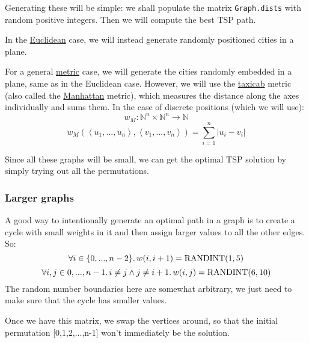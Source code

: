 \documentclass{article}
\newcommand{\randint}{\operatorname{RANDINT}}
\newcommand{\uu}[1]{\underline{#1}}
\newcommand{\py}[1]{\lstinline[language=Python]{#1}}
\begin{document}
Generating these will be simple: we shall populate the matrix
\py{Graph.dists} with random positive integers. Then we will
compute the best TSP path.

In the \uu{Euclidean} case, we will instead generate randomly positioned
cities in a plane.

For a general \uu{metric} case, we will generate the cities randomly embedded
in a plane, same as in the Euclidean case. However, we will use
the \uu{taxicab} metric (also called the \uu{Manhattan} metric), which measures
the distance along the axes individually and sums them. In the case of discrete
positions (which we will use):
\[ w_M: \mathbb{N}^n \times \mathbb{N}^n \to \mathbb{N} \]
\[ w_M\left(\left<u_1,...,u_n\right>, \left<v_1,...,v_n\right>\right) = \sum_{i=1}^n \left|u_i - v_i\right| \]

Since all these graphs will be small, we can get the optimal TSP solution by
simply trying out all the permutations.

\subsubsection{Larger graphs}

A good way to intentionally generate an optimal path in a graph is to create
a cycle with small weights in it and then assign larger values to all the other
edges. So:
\[ \forall i\in\{0,...,n-2\}\ldotp w(i,i+1)=\randint(1,5) \]
\[ \forall i,j\in{0,...,n-1}\ldotp i\ne j \wedge j\ne i+1 \ldotp
w(i,j) = \randint(6,10) \]
The random number boundaries here are somewhat arbitrary, we just need to make
sure that the cycle has smaller values.

Once we have this matrix, we swap the vertices around, so that the initial
permutation [0,1,2,...,n-1] won't immediately be the solution.
\end{document}
